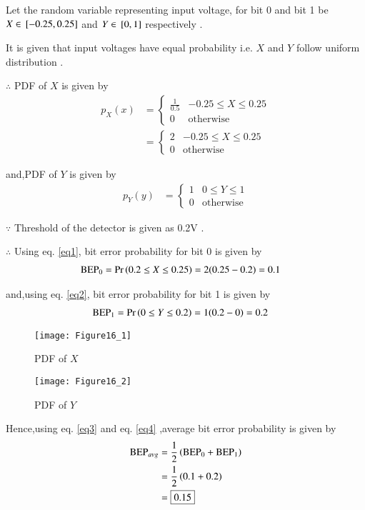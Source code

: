 \documentclass[journal,12pt,twocolumn]{IEEEtran}
\begin{document}
Let the random variable representing input voltage, for bit 0 and bit 1 be $X \in {}\left[-0.25,0.25\right]$  and $Y \in {}\left[0,1\right] $ respectively .

It is given that input voltages have equal probability i.e. $X$ and $Y$ follow uniform distribution .

$\therefore$ PDF of $X$ is given by
\begin{align}
p_X(x) &= 
\begin{cases}  
\frac{1}{0.5} & -0.25 \leq X \leq 0.25 \\
0 &  \text{otherwise}
\end{cases}
\\
&= 
\begin{cases}  \label{eq1}
2 & -0.25 \leq X \leq 0.25 \\     
0 &  \text{otherwise}
\end{cases}
\end{align}

and,PDF of $Y$ is given by
\begin{align}
p_Y(y) &= 
\begin{cases}    \label{eq2}
1 & 0 \leq Y \leq 1 \\
0 &  \text{otherwise}
\end{cases}
\end{align}

$\because$ Threshold of the detector is given as 0.2V .

$\therefore$ Using eq. \eqref{eq1}, bit error probability for bit 0  is given by
\begin{align}
    \text{BEP}_0 &= \Pr\left(0.2 \leq X \leq 0.25\right) = 2(0.25-0.2) = 0.1  \label{eq3}
\end{align}

and,using eq. \eqref{eq2}, bit error probability for bit 1  is given by
\begin{align}
   \text{BEP}_1 &= \Pr\left(0 \leq Y \leq 0.2\right) = 1(0.2-0) = 0.2  \label{eq4}
\end{align}

\begin{figure}[!ht]
\centering
\texttt{[image: Figure16\_1]}
\caption{PDF of $X$}
\label{fig:pdf_x}	
\end{figure}

\begin{figure}[!ht]
\centering
\texttt{[image: Figure16\_2]}
\caption{PDF of $Y$}
\label{fig:pdf_y}	
\end{figure}

Hence,using eq. \eqref{eq3} and eq. \eqref{eq4} ,average bit error probability is given by
\begin{align}
    \text{BEP}_{avg} &= \frac{1}{2}\left(\text{BEP}_0 + \text{BEP}_1\right) \\
    &= \frac{1}{2}\left(0.1+0.2\right) \\
    &= \boxed{0.15}
\end{align}
\end{document}

